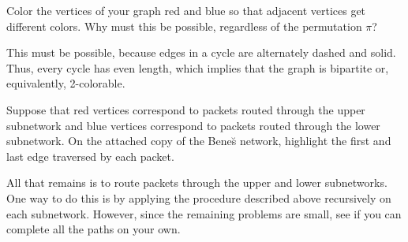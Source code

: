 \begin{problem}
\begin{solution}
\end{solution}

\ppart Color the vertices of your graph red and blue so that adjacent
vertices get different colors.  Why must this be possible, regardless
of the permutation $\pi$?

\begin{solution}

This must be possible, because edges in a cycle are
alternately dashed and solid.  Thus, every cycle has even length,
which implies that the graph is bipartite or, equivalently,
2-colorable.

\begin{figure}[h]
\end{figure}

\end{solution}

\ppart Suppose that red vertices correspond to packets routed through
the upper subnetwork and blue vertices correspond to packets routed
through the lower subnetwork.  On the attached copy of the Bene\u{s}
network, highlight the first and last edge traversed by each packet.

\begin{solution}

\begin{figure}[h]
\end{figure}

\end{solution}

\ppart All that remains is to route packets through the upper and
lower subnetworks.  One way to do this is by applying the procedure
described above recursively on each subnetwork.  However, since the
remaining problems are small, see if you can complete all the paths 
on your own.

\begin{solution}

\begin{figure}[h]
\end{figure}

\end{solution}

\eparts
\end{problem}



\iffalse

One prob on nets is enough.  To use this one, the terminology re
latency and max-congestion needs to be rewritten to match this term's
notes.  So I'm cutting it.  --ARM
\fi

